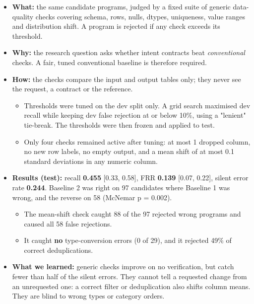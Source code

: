 \documentclass[11pt]{article}
\providecommand{\tightlist}{\setlength{\itemsep}{0pt}\setlength{\parskip}{0pt}}
\begin{document}
\begin{itemize}
\tightlist
\item
  \textbf{What:} the same candidate programs, judged by a fixed suite of
  generic data-quality checks covering schema, rows, nulls, dtypes,
  uniqueness, value ranges and distribution shift. A program is rejected
  if any check exceeds its threshold.
\item
  \textbf{Why:} the research question asks whether intent contracts beat
  \emph{conventional} checks. A fair, tuned conventional baseline is
  therefore required.
\item
  \textbf{How:} the checks compare the input and output tables only;
  they never see the request, a contract or the reference.

  \begin{itemize}
  \tightlist
  \item
    Thresholds were tuned on the dev split only. A grid search maximised
    dev recall while keeping dev false rejection at or below 10\%, using
    a "lenient" tie-break. The thresholds were then frozen and applied
    to test.
  \item
    Only four checks remained active after tuning: at most 1 dropped
    column, no new row labels, no empty output, and a mean shift of at
    most 0.1 standard deviations in any numeric column.
  \end{itemize}
\item
  \textbf{Results (test):} recall \textbf{0.455} {[}0.33, 0.58{]}, FRR
  \textbf{0.139} {[}0.07, 0.22{]}, silent error rate \textbf{0.244}.
  Baseline 2 was right on 97 candidates where Baseline 1 was wrong, and
  the reverse on 58 (McNemar p = 0.002).

  \begin{itemize}
  \tightlist
  \item
    The mean-shift check caught 88 of the 97 rejected wrong programs and
    caused all 58 false rejections.
  \item
    It caught \textbf{no} type-conversion errors (0 of 29), and it
    rejected 49\% of correct deduplications.
  \end{itemize}
\item
  \textbf{What we learned:} generic checks improve on no verification,
  but catch fewer than half of the silent errors. They cannot tell a
  requested change from an unrequested one: a correct filter or
  deduplication also shifts column means. They are blind to wrong types
  or category orders.
\end{itemize}
\end{document}
